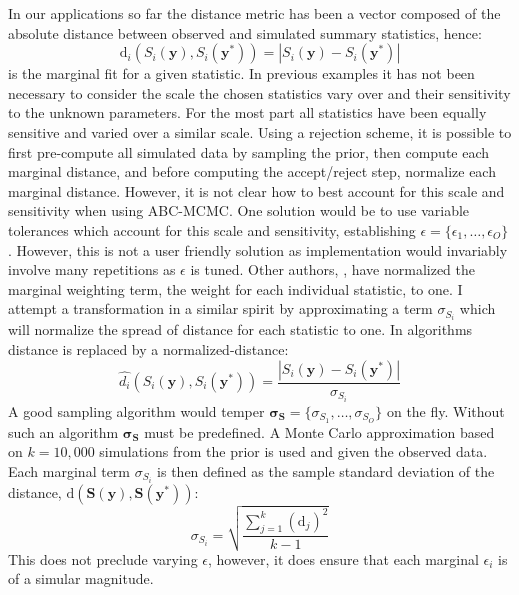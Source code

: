 In our applications so far the distance metric has been a vector composed of the absolute distance between observed and simulated summary statistics, hence:
\begin{equation}
\text{d}_i(S_i(\bm{y}),S_i(\bm{y^*})) = |S_i(\bm{y})-S_i(\bm{y^*})|
\label{marginal_distance}
\end{equation}
is the marginal fit for a given statistic. In previous examples it has not been necessary to consider the scale the chosen statistics vary over and their sensitivity to the unknown parameters. For the most part all statistics have been equally sensitive and varied over a similar scale. Using a rejection scheme, it is possible to first pre-compute all simulated data by sampling the prior, then compute each marginal distance, and before computing the accept/reject step, normalize each marginal distance. However, it is not clear how to best account for this scale and sensitivity when using ABC-MCMC. One solution would be to use variable tolerances which account for this scale and sensitivity, establishing $\epsilon = \{\epsilon_1,\dots,\epsilon_O\}$. However, this is not a user friendly solution as implementation would invariably involve many repetitions as $\epsilon$ is tuned. Other authors, \citet{Ratmann2010}, have normalized the marginal weighting term, the weight for each individual statistic, to one. I attempt a transformation in a similar spirit by approximating a term $\sigma_{S_i}$ which will normalize the spread of distance for each statistic to one. In algorithms distance is replaced by a normalized-distance:
\begin{equation}
\hat{d_i}(S_i(\bm{y}),S_i(\bm{y^*})) =  \frac{|S_i(\bm{y})-S_i(\bm{y^*})|}{\sigma_{S_i}}
\end{equation}
A good sampling algorithm would temper $\bm{\sigma_S} = \{\sigma_{S_1},\dots,\sigma_{S_O}\}$ on the fly. Without such an algorithm $\bm{\sigma_S}$ must be predefined. A Monte Carlo approximation based on $k = 10,000$ simulations from the prior is used and given the observed data. Each marginal term $\sigma_{S_i}$ is then defined as the sample standard deviation of the distance, $\text{d}(\bm{S}(\bm{y}),\bm{S}(\bm{y^*}))$:
\begin{equation}
\sigma_{S_i} = \sqrt{\frac{\sum_{j = 1}^{k}(\text{d}_j)^2}{k-1}}
\end{equation}
This does not preclude varying $\epsilon$, however, it does ensure that each marginal $\epsilon_i$ is of a simular magnitude. \par


